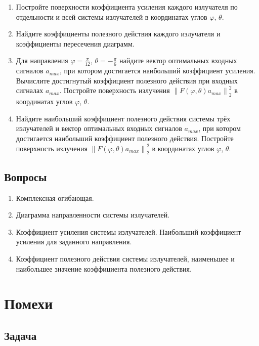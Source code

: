 \documentclass[a4paper,12pt]{article}
\newcommand{\snorm}[1]{\left\| #1 \right\|_2}
\begin{document}
\begin{enumerate}
    \item Постройте поверхности коэффициента усиления каждого излучателя по отдельности и всей системы излучателей
          в координатах углов $\varphi$, $\theta$.
    \item Найдите коэффициенты полезного действия каждого излучателя и коэффициенты пересечения диаграмм.
    \item Для направления $\varphi = \frac{\pi}{12}$, $\theta = -\frac{\pi}{6}$ найдите вектор оптимальных входных сигналов $a_{max}$,
          при котором достигается наибольший коэффициент усиления. Вычислите достигнутый коэффициент полезного действия при входных сигналах $a_{max}$.
          Постройте поверхность излучения $\snorm{F(\varphi, \theta) a_{max}}^2$ в координатах углов $\varphi$, $\theta$.
    \item Найдите наибольший коэффициент полезного действия системы трёх излучателей и вектор оптимальных входных сигналов $a_{max}$,
          при котором достигается наибольший коэффициент полезного действия. Постройте поверхность излучения $\snorm{F(\varphi, \theta) a_{max}}^2$
          в координатах углов $\varphi$, $\theta$.
\end{enumerate}

\subsection{Вопросы}

\begin{enumerate}
    \item Комплексная огибающая.
    \item Диаграмма направленности системы излучателей.
    \item Коэффициент усиления системы излучателей. Наибольший коэффициент усиления для заданного направления.
    \item Коэффициент полезного действия системы излучателей, наименьшее и наибольшее значение коэффициента полезного действия.
\end{enumerate}

\section{Помехи}

\subsection{Задача}
\end{document}

